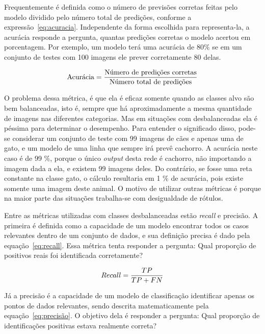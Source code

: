             Frequentemente é definida como o número de previsões corretas feitas pelo modelo dividido pelo número total de predições, conforme a expressão~\ref{eq:acuracia}. Independente da forma escolhida para representa-la, a acurácia responde a pergunta, quantas predições corretas o modelo acertou em porcentagem. Por exemplo, um modelo terá uma acurácia de 80$\%$ se em um conjunto de testes com 100 imagens ele prever corretamente 80 delas. 
            
            \begin{equation}
                \label{eq:acuracia}
                \centering
                \text{Acurácia} = \frac{\text{Número de predições corretas}}{\text{Número total de predições}}
            \end{equation}
            
            O problema dessa métrica, é que ela é eficaz somente quando as classes alvo são bem balanceadas, isto é, sempre que há aproximadamente a mesma quantidade de imagens nas diferentes categorias. Mas em situações com desbalanceadas ela é péssima para determinar o desempenho. Para entender o significado disso, pode-se considerar um conjunto de teste com 99 imagens de cães e apenas uma de gato, e um modelo de uma linha que sempre irá prevê cachorro. A acurácia neste caso é de 99 $\%$, porque o único \textit{output} desta rede é cachorro, não importando a imagem dada a ela, e existem 99 imagens deles. Do contrário, se fosse uma reta constante na classe gato, o cálculo resultaria em 1 $\%$ de acurácia, pois existe somente uma imagem deste animal. O motivo de utilizar outras métricas é porque na maior parte das situações trabalha-se com desigualdade de rótulos.
            
            Entre as métricas utilizadas com classes desbalanceadas estão \textit{recall} e precisão. A primeira é definida como a capacidade de um modelo encontrar todos os casos relevantes dentro de um conjunto de dados, e sua definição precisa é dado pela equação~\ref{eq:recall}. Essa métrica tenta responder a pergunta: Qual proporção de positivos reais foi identificada corretamente? 
            
            \begin{equation}
                \centering
                Recall = \frac{TP}{TP + FN}
                \label{eq:recall}
            \end{equation}
            
            Já a precisão é a capacidade de um modelo de classificação identificar apenas os pontos de dados relevantes, sendo descrita matematicamente pela equação~\ref{eq:precisão}. O objetivo dela é responder a pergunta: Qual proporção de identificações positivas estava realmente correta?
            
